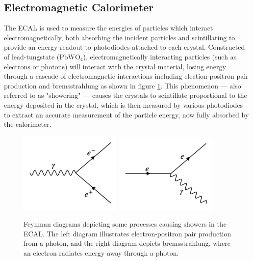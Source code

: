 \subsection{Electromagnetic Calorimeter}
\label{subsec:ecal}
The ECAL is used to measure the energies of particles which interact electromagnetically, both absorbing the incident particles and scintillating to provide an energy-readout to photodiodes attached to each crystal. Constructed of lead-tungstate ($\text{PbWO}_4$), electromagnetically interacting particles (such as electrons or photons) will interact with the crystal material, losing energy through a cascade of electromagnetic interactions including election-positron pair production and bremsstrahlung as shown in figure \ref{fig:ecalFeynman}. This phenomenon --- also referred to as "showering" --- causes the crystals to scintillate proportional to the energy deposited in the crystal, which is then measured by various photodiodes to extract an accurate measurement of the particle energy, now fully absorbed by the calorimeter.
\begin{figure}
	\centering
	\includegraphics[width=0.45\textwidth]{detector/figs/pairProduction}
	\includegraphics[width=0.45\textwidth]{detector/figs/brem}
	\caption{Feynman diagrams depicting some processes causing showers in the ECAL. The left diagram illustrates electron-positron pair production from a photon, and the right diagram depicts bremsstrahlung, where an electron radiates energy away through a photon.}
	\label{fig:ecalFeynman}
\end{figure}

